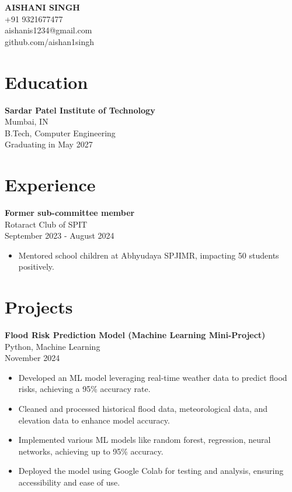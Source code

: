 \documentclass{article}
\begin{document}
\begin{center}
    \textbf{\LARGE AISHANI SINGH} \\
    +91 9321677477 \\
    aishanis1234@gmail.com \\
    github.com/aishan1singh
\end{center}

\section*{Education}
\textbf{Sardar Patel Institute of Technology} \\
Mumbai, IN \\
B.Tech, Computer Engineering \\
Graduating in May 2027

\section*{Experience}
\textbf{Former sub-committee member} \\
Rotaract Club of SPIT \\
September 2023 - August 2024
\begin{itemize}
    \item Mentored school children at Abhyudaya SPJIMR, impacting 50 students positively.
\end{itemize}

\section*{Projects}
\textbf{Flood Risk Prediction Model (Machine Learning Mini-Project)} \\
Python, Machine Learning \\
November 2024
\begin{itemize}
    \item Developed an ML model leveraging real-time weather data to predict flood risks, achieving a 95\% accuracy rate.
    \item Cleaned and processed historical flood data, meteorological data, and elevation data to enhance model accuracy.
    \item Implemented various ML models like random forest, regression, neural networks, achieving up to 95\% accuracy.
    \item Deployed the model using Google Colab for testing and analysis, ensuring accessibility and ease of use.
\end{itemize}
\end{document}
